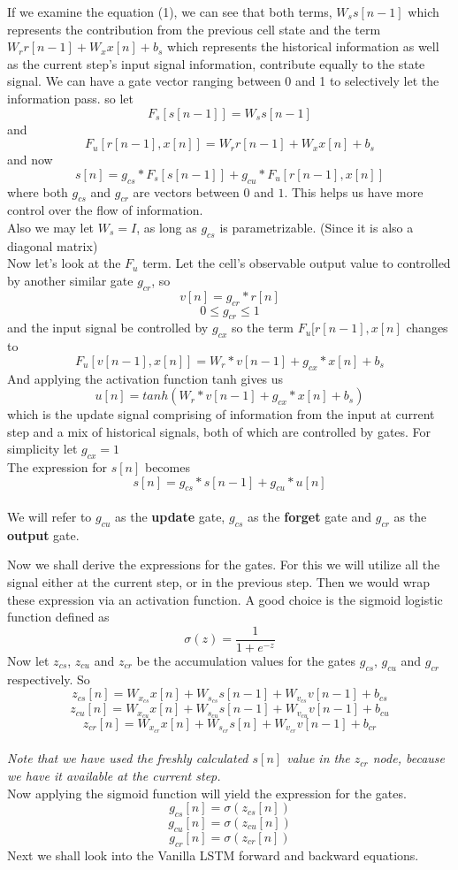 \documentclass[12pt,a4paper]{article}
\begin{document}
{If we examine the equation (1), we can see that both terms,
$W_{s}s[n-1]$ which represents the contribution from the previous cell state and the term $W_{r}r[n-1]+W_{x}x[n]+b_{s}$ which represents the historical information as well as the current step's input signal information, contribute equally to the state signal.
We can have a gate vector ranging between 0 and 1 to selectively let the information pass.
so let
\[
F_{s}[s[n-1]] = W_{s}s[n-1]\tag{18}
\]
and \[
F_{u}[r[n-1],x[n]]  = W_{r}r[n-1]+W_{x}x[n]+b_{s}\tag{19}
\]
and now
\[
s[n] = g_{cs}*F_{s}[s[n-1]] + g_{cu}*F_{u}[r[n-1],x[n]]\tag{20}
\]
where both $g_{cs}$ and $g_{cr}$ are vectors between $0$ and $1$.
This helps us have more control over the flow of information.
\\
Also we may let $W_{s} = I$, as long as $g_{cs}$ is parametrizable. (Since it is also a diagonal matrix)
\\
Now let's look at the $F_{u}$ term.
Let the cell's observable output value to controlled by another similar gate $g_{cr}$, so
\[
v[n] = g_{cr}*r[n]\tag{21}
\]
\[
0 \leq g_{cr} \leq 1\tag{22}
\]
and the input signal be controlled by $g_{cx}$
so the term $F_{u}[r[n-1],x[n]$ changes to 
\[
F_{u}[v[n-1],x[n]] = W_{r}*v[n-1]+ g_{cx}*x[n]+ b_{s}\tag{23}
\]
And applying the activation function tanh gives us
\[
u[n] = tanh(W_{r}*v[n-1]+ g_{cx}*x[n]+ b_{s})\tag{24}
\]
which is the update signal comprising of information from the input at current step and a mix of historical signals, both of which are controlled by gates.
For simplicity let $g_{cx} = 1$
\\
The expression for $s[n]$ becomes
\[
s[n] = g_{cs}*s[n-1] + g_{cu}*u[n]\tag{25}
\]
\\
We will refer to $g_{cu}$ as the \textbf{update} gate,
$g_{cs}$ as the \textbf{forget} gate and
$g_{cr}$ as the \textbf{output} gate.

Now we shall derive the expressions for the gates.
For this we will utilize all the signal either at the current step, or in the previous step.
Then we would wrap these expression via an activation function. A good choice is the sigmoid logistic function defined as
\[
\sigma(z) = \frac{1}{1+e^{-z}}\tag{26}
\]
Now let $z_{cs}$, $z_{cu}$ and $z_{cr}$ be the accumulation values for the gates $g_{cs}$, $g_{cu}$ and $g_{cr}$ respectively. 
So
\[
z_{cs}[n] = W_{x_{cs}}x[n] + W_{s_{cs}}s[n-1] + W_{v_{cs}}v[n-1]+b_{cs}\tag{27}
\]
\[
z_{cu}[n] = W_{x_{cu}}x[n] + W_{s_{cu}}s[n-1] + W_{v_{cu}}v[n-1]+b_{cu}\tag{28}
\]
\[
z_{cr}[n] = W_{x_{cr}}x[n] + W_{s_{cr}}s[n] + W_{v_{cr}}v[n-1]+b_{cr}\tag{29}
\]
\\
\textit{Note that we have used the freshly calculated $s[n]$ value in the $z_{cr}$ node, because we have it available at the current step.}\\
Now applying the sigmoid function will yield the expression for the gates.
\[
g_{cs}[n] = \sigma(z_{cs}[n])\tag{30}
\]
\[
g_{cu}[n] = \sigma(z_{cu}[n])\tag{31}
\]
\[
g_{cr}[n] = \sigma(z_{cr}[n])\tag{32}
\]
Next we shall look into the Vanilla LSTM forward and backward equations.

}
\end{document}
